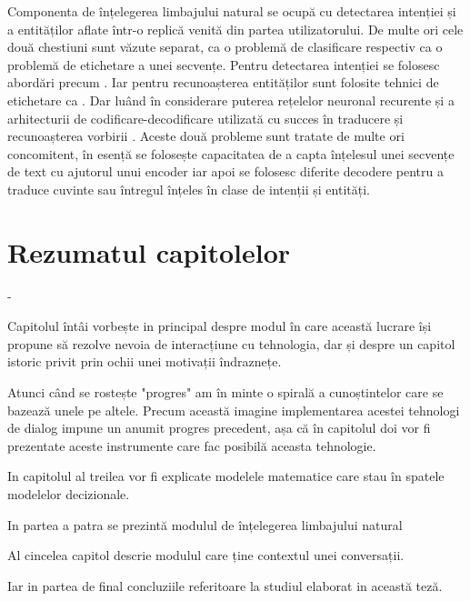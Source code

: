 Componenta de înțelegerea limbajului natural se ocupă cu detectarea intenției și a entităților aflate într-o replică venită din partea utilizatorului. De multe ori cele două chestiuni sunt văzute separat, ca o problemă de clasificare respectiv ca o problemă de etichetare a unei secvențe.
Pentru detectarea intenției se folosesc abordări precum \cite{id_classifiers}. Iar pentru recunoașterea entităților sunt folosite tehnici de etichetare ca \cite{scipy_numpyeq_labeling}. Dar luând în considerare puterea rețelelor neuronal recurente și a arhitecturii de codificare-decodificare utilizată cu succes în traducere și recunoașterea vorbirii \cite{luoung_bahdanau_maning}. Aceste două probleme sunt tratate de multe ori concomitent, în esență se folosește capacitatea de a capta înțelesul unei secvențe de text cu ajutorul unui encoder iar apoi se folosesc diferite decodere pentru a traduce cuvinte sau întregul înțeles în clase de intenții și entități.



\section{Rezumatul capitolelor}
\begin{description}
	\item[Introducere]  - 
	
	Capitolul întâi vorbește in principal despre modul în care această lucrare își propune să rezolve nevoia de interacțiune cu tehnologia, dar și despre un capitol istoric privit prin ochii unei motivații îndraznețe.
	\item
	Atunci când se rostește "progres" am în minte o  spirală a cunoștintelor care se bazează unele pe altele. Precum această imagine implementarea acestei tehnologi de dialog impune un anumit progres precedent, așa că în capitolul doi vor fi prezentate aceste instrumente care fac posibilă aceasta tehnologie.
	\item
	In capitolul al treilea vor fi explicate modelele matematice care stau în spatele modelelor decizionale.
	\item
	In partea a patra se prezintă modulul de înțelegerea limbajului natural
	\item
	Al cincelea capitol descrie modulul care ține contextul unei conversații.
	\item
	Iar in partea de final concluziile referitoare la studiul elaborat in această teză.
\end{description}

